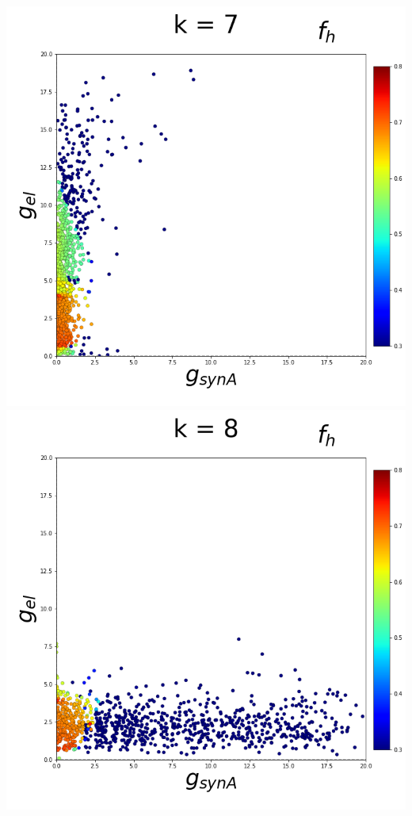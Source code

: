\documentclass[11pt]{article}
\begin{document}
\begin{center}
\includegraphics[scale=0.125]{DSN_figs/STGCircuit_DSN_c=0_rs=1_k=7.png}
\includegraphics[scale=0.125]{DSN_figs/STGCircuit_DSN_c=0_rs=1_k=8.png}

\end{center}
\end{document}
